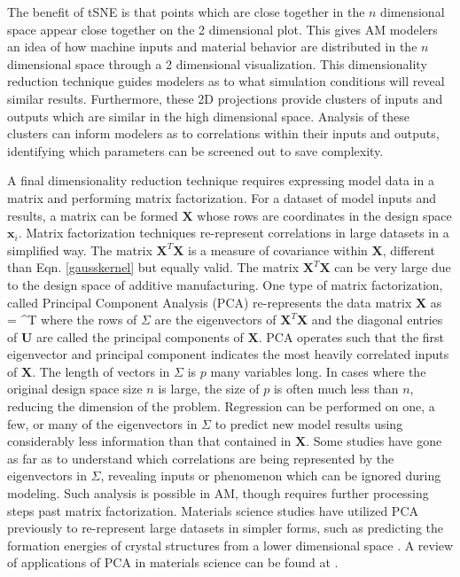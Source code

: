 The benefit of tSNE is that points which are close together in the $n$ dimensional space appear close together on the 2 dimensional plot. This gives AM modelers an idea of how machine inputs and material behavior are distributed in the $n$ dimensional space through a 2 dimensional visualization. This dimensionality reduction technique guides modelers as to what simulation conditions will reveal similar results. Furthermore, these 2D projections provide clusters of inputs and outputs which are similar in the high dimensional space. Analysis of these clusters can inform modelers as to correlations within their inputs and outputs, identifying which parameters can be screened out to save complexity.

A final dimensionality reduction technique requires expressing model data in a matrix and performing matrix factorization. For a dataset of model inputs and results, a matrix can be formed $\mathbf{X}$ whose rows are coordinates in the design space $\mathbf{x}_i$. Matrix factorization techniques re-represent correlations in large datasets in a simplified way. The matrix $\mathbf{X}^T\mathbf{X}$ is a measure of covariance within $\mathbf{X}$, different than Eqn. \ref{gausskernel} but equally valid. The matrix $\mathbf{X}^T\mathbf{X}$ can be very large due to the design space of additive manufacturing. One type of matrix factorization, called Principal Component Analysis (PCA) re-represents the data matrix $\mathbf{X}$ as
\eqn
	 =  \mathbf{\Sigma}^T
	\label{PCA}
\equ
where the rows of $\Sigma$ are the eigenvectors of $\mathbf{X}^T\mathbf{X}$ and the diagonal entries of $\mathbf{U}$ are called the principal components of $\mathbf{X}$. PCA operates such that the first eigenvector and principal component indicates the most heavily correlated inputs of $\mathbf{X}$. The length of vectors in $\Sigma$ is $p$ many variables long. In cases where the original design space size $n$ is large, the size of $p$ is often much less than $n$, reducing the dimension of the problem. Regression can be performed on one, a few, or many of the eigenvectors in $\Sigma$ to predict new model results using considerably less information than that contained in $\mathbf{X}$. Some studies have gone as far as to understand which correlations are being represented by the eigenvectors in $\Sigma$, revealing inputs or phenomenon which can be ignored during modeling. Such analysis is possible in AM, though requires further processing steps past matrix factorization. Materials science studies have utilized PCA previously to re-represent large datasets in simpler forms, such as predicting the formation energies of crystal structures from a lower dimensional space \cite{Curtarolo2003}. A review of applications of PCA in materials science can be found at \cite{Rajan2009}.

